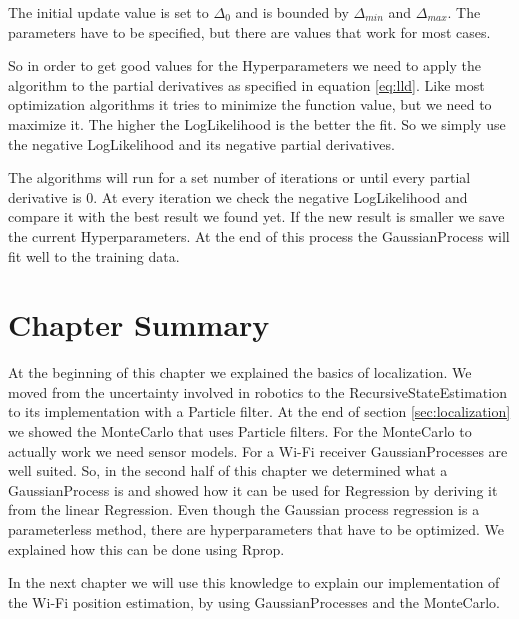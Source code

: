 The initial update value is set to $\Delta_0$ and is bounded by $\Delta_{min}$ and $\Delta_{max}$. The parameters have to be specified, but there are values that work for most cases\citep{blum2013optimization}. 

So in order to get good values for the \gls{Hyperparameter}s we need to apply the algorithm to the partial derivatives as specified in equation \ref{eq:lld}. Like most optimization algorithms it tries to minimize the function value, but we need to maximize it. The higher the \gls{LogLikelihood} is the better the fit. So we simply use the negative \gls{LogLikelihood} and its negative partial derivatives. 

The algorithms will run for a set number of iterations or until every partial derivative is 0. At every iteration we check the negative \gls{LogLikelihood} and compare it with the best result we found yet. If the new result is smaller we save the current \gls{Hyperparameter}s. At the end of this process the \Gls{GaussianProcess} will fit well to the training data\citep{blum2013optimization}.

\section{Chapter Summary}
At the beginning of this chapter we explained the basics of localization. We moved from the uncertainty involved in robotics to the \gls{RecursiveStateEstimation} to its implementation with a \gls{Particle} filter. At the end of section \ref{sec:localization} we showed the \Gls{MonteCarlo} that uses \gls{Particle} filters. For the \Gls{MonteCarlo} to actually work we need sensor models. For a Wi-Fi receiver \Gls{GaussianProcess}es are well suited. 
So, in the second half of this chapter we determined what a \Gls{GaussianProcess} is and showed how it can be used for \gls{Regression} by deriving it from the linear \gls{Regression}. Even though the Gaussian process regression is a parameterless method, there are hyperparameters that have to be optimized. We explained how this can be done using \Gls{Rprop}. 

In the next chapter we will use this knowledge to explain our implementation of the Wi-Fi position estimation, by using \Gls{GaussianProcess}es and the \Gls{MonteCarlo}. 